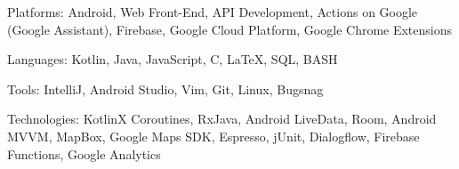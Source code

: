 \documentclass[9pt,letterpaper]{article}
\newenvironment{indentsection}[1]%
{\begin{list}{}%
	{\setlength{\leftmargin}{#1}}%
	\item[]%
}
{\end{list}}
\newcommand{\CPP}
{C\nolinebreak[4]\hspace{-.05em}\raisebox{.22ex}{\footnotesize\bf ++}}
\begin{document}
\begin{indentsection}{\parindent}
\begin{description*}
	\item[Platforms:]
	Android, Web Front-End, API Development, Actions on Google (Google Assistant), Firebase, Google Cloud Platform, Google Chrome Extensions
	\item[Languages:]
	Kotlin, Java, JavaScript, \CPP, \LaTeX, SQL, BASH
	\item[Tools:]
	IntelliJ, Android Studio, Vim, Git, Linux, Bugsnag
	\item[Technologies:]
	KotlinX Coroutines, RxJava, Android LiveData, Room, Android MVVM, MapBox, Google Maps SDK, Espresso, jUnit, Dialogflow, Firebase Functions, Google Analytics
\end{description*}
\end{indentsection}
\end{document}
